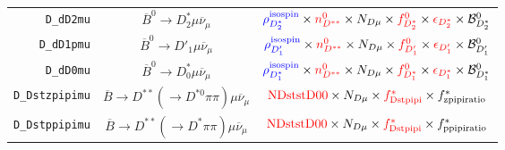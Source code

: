 \begin{landscape}
\begin{table}
\begin{tabular}{r|c|c}
        \texttt{D\_dD2mu} &              $\overline{B}^0 \rightarrow D^*_2 \mu \overline{\nu}_\mu$               &                                                                                  $\textcolor{blue}{\rho^\text{isospin}_{D_2^*}} \times \textcolor{red}{n^{0}_{D^{**}}} \times N_{D \mu} \times \textcolor{red}{f^{0}_{D_2^*}} \times \textcolor{red}{\epsilon_{D_2^*}} \times \mathcal{B}^{0}_{D_2^*}$                                                                                   \\
       \texttt{D\_dD1pmu} &               $\overline{B}^0 \rightarrow D'_1 \mu \overline{\nu}_\mu$               &                                                                                    $\textcolor{blue}{\rho^\text{isospin}_{D'_1}} \times \textcolor{red}{n^{0}_{D^{**}}} \times N_{D \mu} \times \textcolor{red}{f^{0}_{D'_1}} \times \textcolor{red}{\epsilon_{D'_1}} \times \mathcal{B}^{0}_{D'_1}$                                                                                     \\
        \texttt{D\_dD0mu} &              $\overline{B}^0 \rightarrow D^*_0 \mu \overline{\nu}_\mu$               &                                                                                  $\textcolor{blue}{\rho^\text{isospin}_{D_1^*}} \times \textcolor{red}{n^{0}_{D^{**}}} \times N_{D \mu} \times \textcolor{red}{f^{0}_{D_1^*}} \times \textcolor{red}{\epsilon_{D_1^*}} \times \mathcal{B}^{0}_{D_1^*}$                                                                                   \\
   \texttt{D\_Dstzpipimu} & $\overline{B} \rightarrow D^{**} (\rightarrow D^{*0} \pi\pi) \mu \overline{\nu}_\mu$ &                                                                                                                             $\textcolor{red}{\text{NDststD00}} \times N_{D \mu} \times \textcolor{red}{f^{*}_\text{Dstpipi}} \times f^{*}_\text{zpipiratio}$                                                                                                                             \\
   \texttt{D\_Dstppipimu} &  $\overline{B} \rightarrow D^{**} (\rightarrow D^* \pi\pi) \mu \overline{\nu}_\mu$   &                                                                                                                             $\textcolor{red}{\text{NDststD00}} \times N_{D \mu} \times \textcolor{red}{f^{*}_\text{Dstpipi}} \times f^{*}_\text{ppipiratio}$                                                                                                                             \\

\end{tabular}
\end{table}
\end{landscape}
